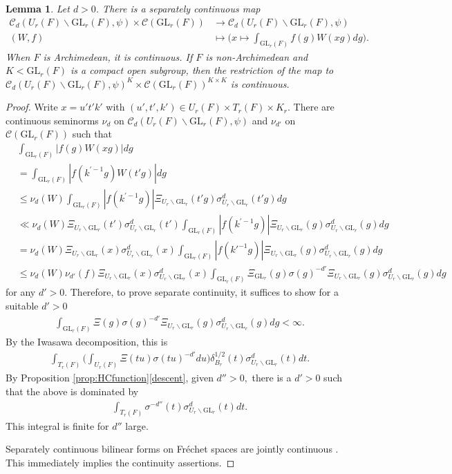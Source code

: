 \documentclass[12pt]{amsart}
\newtheorem{lem}[thm]{Lemma}
\theoremstyle{remark}
\numberwithin{equation}{section}
\newcommand{\GL}{\mathrm{GL}}
\newcommand{\lto}{\longrightarrow}
\theoremstyle{definition}
\numberwithin{equation}{subsection}
\begin{document}
\begin{lem} \label{lem:cont}
Let $d>0$. There is a separately continuous map
\begin{align*}
\mathcal{C}_d(U_r(F) \backslash \GL_r(F),\psi) \times \mathcal{C}(\GL_r(F)) &\lto \mathcal{C}_d(U_r(F) \backslash \GL_r(F),\psi)\\
(W,f) &\longmapsto \Big(x \mapsto \int_{\GL_r(F)}f(g)W(xg)dg\Big).
\end{align*}
When $F$ is Archimedean, it is continuous.  If $F$ is non-Archimedean and $K <\GL_r(F)$ is a compact open subgroup, then the restriction of the map to $\mathcal{C}_d(U_r(F) \backslash \GL_r(F),\psi)^K \times \mathcal{C}(\GL_r(F))^{K \times K}$ is continuous.  
\end{lem}
\begin{proof}
Write $x=u't'k'$ with $(u',t',k') \in U_r(F) \times T_r(F) \times K_r.$  There are continuous seminorms $\nu_d$ on $\mathcal{C}_d(U_r(F) \backslash \GL_r(F),\psi)$ and $\nu_{d'}$ on $\mathcal{C}(\GL_r(F))$ such that 
\begin{align*}
    &\int_{\GL_r(F)}|f(g)W(xg)|dg\\
    &=\int_{\GL_r(F)}|f(k^{\prime-1}g)W(t'g)|dg\\
    &\leq \nu_d(W) \int_{\GL_r(F)}|f(k^{\prime-1}g)|\Xi_{U_r \backslash \GL_r} (t'g)\sigma^d_{U_r\backslash \GL_r}(t'g)dg\\
    &\ll \nu_d(W)\Xi_{U_r \backslash \GL_r} (t')\sigma^d_{U_r\backslash \GL_r}(t')\int_{\GL_r(F)}|f(k^{\prime-1}g)|\Xi_{U_r \backslash \GL_r} (g)\sigma_{U_r\backslash \GL_r}^d(g)dg\\
    &=\nu_d(W)\Xi_{U_r \backslash \GL_r} (x)\sigma_{U_r\backslash \GL_r}^d(x)\int_{\GL_r(F)}|f(k'^{-1}g)|\Xi_{U_r \backslash \GL_r} (g)\sigma_{U_r\backslash \GL_r}^d(g)dg\\
    &\leq \nu_d(W)\nu_{d'}(f) \Xi_{U_r \backslash \GL_r} (x)\sigma_{U_r\backslash \GL_r}^d(x)\int_{\GL_r(F)}\Xi_{\GL_r}(g)\sigma(g)^{-d'}\Xi_{U_r \backslash \GL_r} (g)\sigma_{U_r\backslash \GL_r}^d(g) dg
\end{align*}
for any $d'>0.$ Therefore, to prove separate continuity, it suffices to show for a suitable $d'>0$
\begin{align*}
    \int_{\GL_r(F)}\Xi(g)\sigma(g)^{-d'}\Xi_{U_r \backslash \GL_r} (g)\sigma^d_{U_r\backslash \GL_r}(g)dg<\infty.
\end{align*}
By the Iwasawa decomposition, this is
\begin{align*}
     \int_{T_r(F)}\Big(\int_{U_r(F)}\Xi(tu)\sigma(tu)^{-d'} du\Big)\delta_{B_r}^{1/2} (t)\sigma^d_{U_r\backslash \GL_r}(t) dt.
\end{align*}
By Proposition \ref{prop:HCfunction}\ref{descent}, given $d''>0,$ there is a $d'>0$ such that the above is dominated by
\begin{align*}
     \int_{T_r(F)} \sigma^{-d''}(t)\sigma_{U_r\backslash \GL_r}^d(t) dt.
\end{align*}
This integral is finite for $d''$ large.

Separately continuous bilinear forms on Fr\'echet spaces are jointly continuous \cite[Corollary to Theorem 34.1]{Treves}.  This immediately implies the continuity assertions.
\end{proof}
\end{document}
